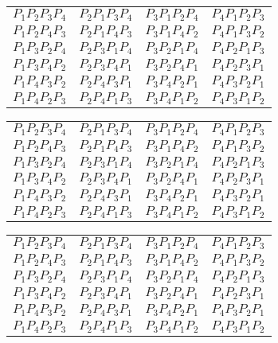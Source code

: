 \documentclass{article}
\begin{document}
\begin{center}
\Large
\begin{tabular}{cccc}
	$P_1 P_2 P_3 P_4 $&$ P_2 P_1  P_3 P_4 $&$  P_3 P_1 P_2 P_4 $&$ P_4 P_1 P_2 P_3 $\\
	$P_1 P_2 P_4 P_3 $&$ P_2 P_1 P_4  P_3 $&$  P_3 P_1 P_4 P_2 $&$ P_4 P_1 P_3 P_2  $\\
	$P_1 P_3 P_2 P_4 $&$ P_2 P_3  P_1 P_4 $&$  P_3 P_2 P_1 P_4 $&$ P_4 P_2 P_1 P_3  $\\
	$P_1 P_3 P_4 P_2 $&$ P_2 P_3  P_4 P_1 $&$  P_3 P_2 P_4 P_1 $&$ P_4 P_2 P_3 P_1  $\\
	$P_1 P_4 P_3 P_2 $&$ P_2 P_4  P_3 P_1 $&$  P_3 P_4 P_2 P_1 $&$ P_4 P_3 P_2 P_1  $\\
	$P_1 P_4 P_2 P_3 $&$ P_2 P_4  P_1 P_3 $&$  P_3 P_4 P_1 P_2 $&$ P_4 P_3 P_1 P_2  $\\
\end{tabular}
\vfill
\begin{tabular}{cccc}
	$P_1 P_2 P_3 P_4 $&$ P_2 P_1  P_3 P_4 $&$  P_3 P_1 P_2 P_4 $&$ P_4 P_1 P_2 P_3 $\\
	$P_1 P_2 P_4 P_3 $&$ P_2 P_1 P_4  P_3 $&$  P_3 P_1 P_4 P_2 $&$ P_4 P_1 P_3 P_2  $\\
	$P_1 P_3 P_2 P_4 $&$ P_2 P_3  P_1 P_4 $&$  P_3 P_2 P_1 P_4 $&$ P_4 P_2 P_1 P_3  $\\
	$P_1 P_3 P_4 P_2 $&$ P_2 P_3  P_4 P_1 $&$  P_3 P_2 P_4 P_1 $&$ P_4 P_2 P_3 P_1  $\\
	$P_1 P_4 P_3 P_2 $&$ P_2 P_4  P_3 P_1 $&$  P_3 P_4 P_2 P_1 $&$ P_4 P_3 P_2 P_1  $\\
	$P_1 P_4 P_2 P_3 $&$ P_2 P_4  P_1 P_3 $&$  P_3 P_4 P_1 P_2 $&$ P_4 P_3 P_1 P_2  $\\
\end{tabular}
\vfill
\begin{tabular}{cccc}
	$P_1 P_2 P_3 P_4 $&$ P_2 P_1  P_3 P_4 $&$  P_3 P_1 P_2 P_4 $&$ P_4 P_1 P_2 P_3 $\\
	$P_1 P_2 P_4 P_3 $&$ P_2 P_1 P_4  P_3 $&$  P_3 P_1 P_4 P_2 $&$ P_4 P_1 P_3 P_2  $\\
	$P_1 P_3 P_2 P_4 $&$ P_2 P_3  P_1 P_4 $&$  P_3 P_2 P_1 P_4 $&$ P_4 P_2 P_1 P_3  $\\
	$P_1 P_3 P_4 P_2 $&$ P_2 P_3  P_4 P_1 $&$  P_3 P_2 P_4 P_1 $&$ P_4 P_2 P_3 P_1  $\\
	$P_1 P_4 P_3 P_2 $&$ P_2 P_4  P_3 P_1 $&$  P_3 P_4 P_2 P_1 $&$ P_4 P_3 P_2 P_1  $\\
	$P_1 P_4 P_2 P_3 $&$ P_2 P_4  P_1 P_3 $&$  P_3 P_4 P_1 P_2 $&$ P_4 P_3 P_1 P_2  $\\
\end{tabular}
\end{center}
\end{document}
